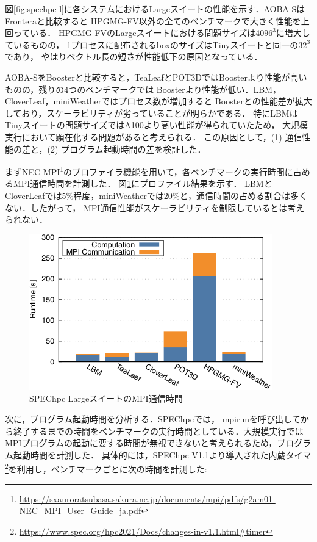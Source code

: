 ﻿\documentclass[submit,techrep,noauthor]{ipsj}
\begin{document}
図\ref{fig:spechpc-l}に各システムにおけるLargeスイートの性能を示す．AOBA-SはFronteraと比較すると
HPGMG-FV以外の全てのベンチマークで大きく性能を上回っている．
HPGMG-FVのLargeスイートにおける問題サイズは$4096^3$に増大しているものの，
1プロセスに配布されるboxのサイズはTinyスイートと同一の$32^3$であり，
やはりベクトル長の短さが性能低下の原因となっている．

AOBA-SをBoosterと比較すると，TeaLeafとPOT3DではBoosterより性能が高いものの，残りの4つのベンチマークでは
Boosterより性能が低い．LBM，CloverLeaf，miniWeatherではプロセス数が増加すると
Boosterとの性能差が拡大しており，スケーラビリティが劣っていることが明らかである．
特にLBMはTinyスイートの問題サイズではA100より高い性能が得られていたため，
大規模実行において顕在化する問題があると考えられる．
この原因として，(1) 通信性能の差と，(2) プログラム起動時間の差を検証した．

まずNEC MPI\footnote{\url{https://sxauroratsubasa.sakura.ne.jp/documents/mpi/pdfs/g2am01-NEC_MPI_User_Guide_ja.pdf}}のプロファイラ機能を用いて，各ベンチマークの実行時間に占めるMPI通信時間を計測した．
図\ref{fig:spechpc-profile1}にプロファイル結果を示す．
LBMとCloverLeafでは5\%程度，miniWeatherでは20\%と，通信時間の占める割合は多くない．したがって，
MPI通信性能がスケーラビリティを制限しているとは考えられない．

\begin{figure}[tb]
  \centering
  \includegraphics{figs/spechpc_profile.pdf}
  \caption{SPEChpc LargeスイートのMPI通信時間}\label{fig:spechpc-profile1}
\end{figure}

次に，プログラム起動時間を分析する．SPEChpcでは，
mpirunを呼び出してから終了するまでの時間をベンチマークの実行時間としている．大規模実行では
MPIプログラムの起動に要する時間が無視できないと考えられるため，プログラム起動時間を計測した．
具体的には，SPEChpc
V1.1より導入された内蔵タイマ\footnote{\url{https://www.spec.org/hpc2021/Docs/changes-in-v1.1.html#timer}}を利用し，ベンチマークごとに次の時間を計測した:
\end{document}
